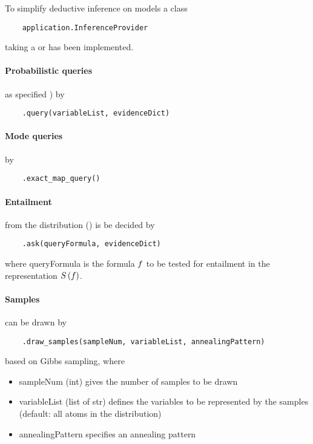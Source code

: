 
To simplify deductive inference on models a class
\begin{lstlisting}
	application.InferenceProvider
\end{lstlisting}
taking a  or  has been implemented.

\paragraph{Probabilistic queries} as specified )  by
\begin{lstlisting}
	.query(variableList, evidenceDict)
\end{lstlisting}

\paragraph{Mode queries} by
\begin{lstlisting}
	.exact_map_query()
\end{lstlisting}

\paragraph{Entailment} from the distribution () is be decided by
\begin{lstlisting}
	.ask(queryFormula, evidenceDict)
\end{lstlisting}
where queryFormula is the formula $f$ to be tested for entailment in the representation $S\left(f\right)$.

\paragraph{Samples} can be drawn by
\begin{lstlisting}
	.draw_samples(sampleNum, variableList, annealingPattern)
\end{lstlisting}
based on Gibbs sampling, where
\begin{itemize}
    \item sampleNum (int) gives the number of samples to be drawn
    \item variableList (list of str) defines the variables to be represented by the samples (default: all atoms in the distribution)
    \item annealingPattern specifies an annealing pattern
\end{itemize}



